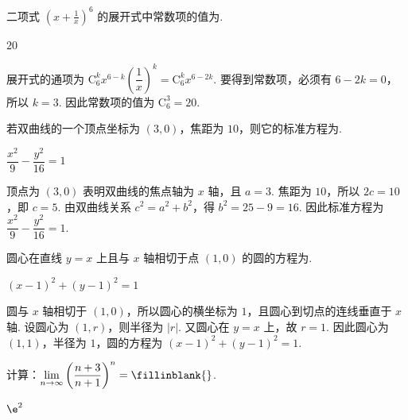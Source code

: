 \begin{problem}
二项式 \(\left(x+\frac{1}{x}\right)^{6}\) 的展开式中常数项的值为\fillinblank{}.
\end{problem}

\begin{answer}
\(20\)
\end{answer}

\begin{solution}
展开式的通项为 \(\mathrm C_6^k x^{6-k}\left(\dfrac{1}{x}\right)^k=\mathrm C_6^k x^{6-2k}\). 要得到常数项，必须有 \(6-2k=0\)，所以 \(k=3\). 因此常数项的值为 \(\mathrm C_6^3=20\).
\end{solution}

\begin{problem}
若双曲线的一个顶点坐标为 \((3,0)\)，焦距为 \(10\)，则它的标准方程为\fillinblank{}.
\end{problem}

\begin{answer}
\(\dfrac{x^{2}}{9}-\dfrac{y^{2}}{16}=1\)
\end{answer}

\begin{solution}
顶点为 \((3,0)\) 表明双曲线的焦点轴为 \(x\) 轴，且 \(a=3\). 焦距为 \(10\)，所以 \(2c=10\)，即 \(c=5\). 由双曲线关系 \(c^{2}=a^{2}+b^{2}\)，得 \(b^{2}=25-9=16\). 因此标准方程为 \(\dfrac{x^{2}}{9}-\dfrac{y^{2}}{16}=1\).
\end{solution}

\begin{problem}
圆心在直线 \(y=x\) 上且与 \(x\) 轴相切于点 \((1,0)\) 的圆的方程为\fillinblank{}.
\end{problem}

\begin{answer}
\((x-1)^{2}+(y-1)^{2}=1\)
\end{answer}

\begin{solution}
圆与 \(x\) 轴相切于 \((1,0)\)，所以圆心的横坐标为 \(1\)，且圆心到切点的连线垂直于 \(x\) 轴. 设圆心为 \((1,r)\)，则半径为 \(|r|\). 又圆心在 \(y=x\) 上，故 \(r=1\). 因此圆心为 \((1,1)\)，半径为 \(1\)，圆的方程为 \((x-1)^{2}+(y-1)^{2}=1\).
\end{solution}

\begin{problem}
计算：\(\displaystyle\lim_{n\to\infty}\left(\frac{n+3}{n+1}\right)^{n}=\fillinblank{}\).
\end{problem}

\begin{answer}
\(\e^{2}\)
\end{answer}

